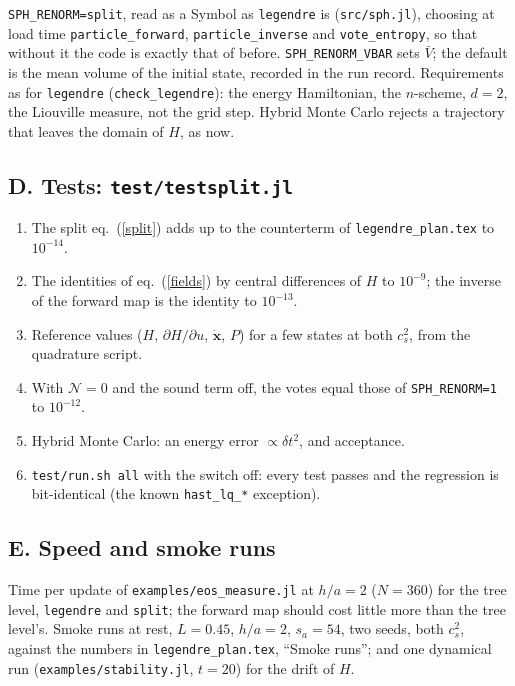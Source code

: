 \documentclass[11pt,aps,preprint,nofootinbib,superscriptaddress,tightenlines]{revtex4-2}
\def\Eq#1{eq.~(\ref{#1})}
\begin{document}
\texttt{SPH\_RENORM=split}, read as a Symbol as \texttt{legendre} is (\nolinkurl{src/sph.jl}), choosing at load time \texttt{particle\_forward},
\texttt{particle\_inverse} and \texttt{vote\_entropy}, so that without it the code is exactly that of before.  \texttt{SPH\_RENORM\_VBAR} sets $\bar V$; the
default is the mean volume of the initial state, recorded in the run record.  Requirements as for \texttt{legendre} (\texttt{check\_legendre}): the energy
Hamiltonian, the $n$-scheme, $d=2$, the Liouville measure, not the grid step.  Hybrid Monte Carlo rejects a trajectory that leaves the domain of $H$, as now.

\subsection{D. Tests: \texorpdfstring{\nolinkurl{test/testsplit.jl}}{test/testsplit.jl}}

\begin{enumerate}
\item The split \Eq{split} adds up to the counterterm of \nolinkurl{legendre_plan.tex} to $10^{-14}$.
\item The identities of \Eq{fields} by central differences of $H$ to $10^{-9}$; the inverse of the forward map is the identity to $10^{-13}$.
\item Reference values ($H$, $\partial H/\partial u$, $\dot{\bm x}$, $P$) for a few states at both $c_s^2$, from the quadrature script.
\item With $\mathcal N=0$ and the sound term off, the votes equal those of \texttt{SPH\_RENORM=1} to $10^{-12}$.
\item Hybrid Monte Carlo: an energy error $\propto\delta t^2$, and acceptance.
\item \texttt{test/run.sh all} with the switch off: every test passes and the regression is bit-identical (the known \texttt{hast\_lq\_*} exception).
\end{enumerate}

\subsection{E. Speed and smoke runs}

Time per update of \nolinkurl{examples/eos_measure.jl} at $h/a=2$ ($N=360$) for the tree level, \texttt{legendre} and \texttt{split}; the forward map should cost little
more than the tree level's.  Smoke runs at rest, $L=0.45$, $h/a=2$, $s_a=54$, two seeds, both $c_s^2$, against the numbers in \nolinkurl{legendre_plan.tex}, ``Smoke
runs''; and one dynamical run (\nolinkurl{examples/stability.jl}, $t=20$) for the drift of $H$.
\end{document}
